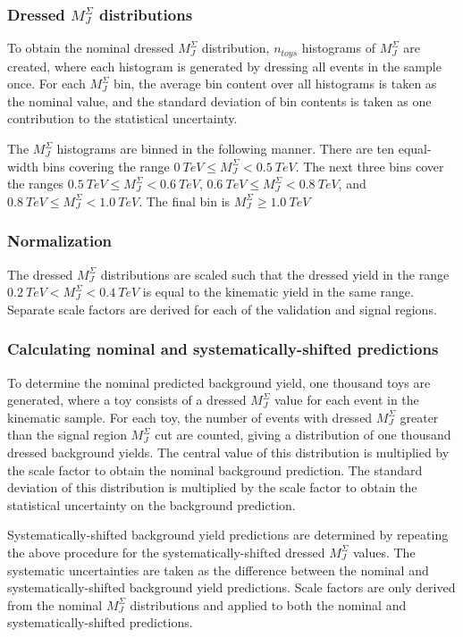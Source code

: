\subsubsection{Dressed $M_{J}^{\Sigma}$ distributions}
To obtain the nominal dressed $M_{J}^{\Sigma}$ distribution,
$n_{toys}$ histograms of $M_{J}^{\Sigma}$ are created, where each
histogram is generated by dressing all events in the sample once. For
each $M_{J}^{\Sigma}$ bin, the average bin content over all histograms is taken
as the nominal value, and the standard deviation of bin contents is
taken as one contribution to the statistical uncertainty.

The $M_{J}^{\Sigma}$ histograms are binned in the following
manner. There are ten equal-width bins covering the range $0~TeV \leq M_{J}^{\Sigma} <
0.5~TeV$. The next three bins cover the ranges $0.5~TeV \leq M_{J}^{\Sigma} <
0.6~TeV$, $0.6~TeV \leq M_{J}^{\Sigma} <
0.8~TeV$, and $0.8~TeV \leq M_{J}^{\Sigma} <
1.0~TeV$. The final bin is $M_{J}^{\Sigma} \geq
1.0~TeV$

\subsubsection{Normalization}
The dressed $M_{J}^{\Sigma}$ distributions are scaled such that the
dressed yield in the range  $0.2~TeV < M_{J}^{\Sigma} <
0.4~TeV$ is equal to the kinematic yield in the same range. Separate
scale factors are derived for each of the validation and signal regions.

\subsubsection{Calculating nominal and systematically-shifted
  predictions}
To determine the nominal predicted background yield, one thousand toys
are generated, where a toy consists of a dressed $M_{J}^{\Sigma}$ value for
each event in the kinematic sample. For each toy, the number of events
with dressed $M_{J}^{\Sigma}$ greater than the signal region
$M_{J}^{\Sigma}$ cut are counted, giving a distribution of one
thousand dressed background yields. The central value of this distribution is
multiplied by the scale factor to obtain the nominal background
prediction. The standard deviation of this distribution is multiplied
by the scale factor to obtain the statistical uncertainty on the
background prediction.

Systematically-shifted background yield predictions are determined by repeating
the above procedure for the systematically-shifted dressed
$M_{J}^{\Sigma}$ values. The systematic uncertainties are taken as the
difference between the nominal and systematically-shifted background
yield predictions. Scale factors are only derived from the nominal
$M_{J}^{\Sigma}$ distributions and applied to both the nominal and
systematically-shifted predictions.

